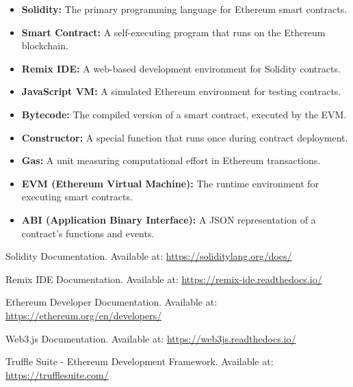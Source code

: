\documentclass[11pt]{article}
\begin{document}
\begin{itemize}
    \item \textbf{Solidity:} The primary programming language for Ethereum smart contracts.
    \item \textbf{Smart Contract:} A self-executing program that runs on the Ethereum blockchain.
    \item \textbf{Remix IDE:} A web-based development environment for Solidity contracts.
    \item \textbf{JavaScript VM:} A simulated Ethereum environment for testing contracts.
    \item \textbf{Bytecode:} The compiled version of a smart contract, executed by the EVM.
    \item \textbf{Constructor:} A special function that runs once during contract deployment.
    \item \textbf{Gas:} A unit measuring computational effort in Ethereum transactions.
    \item \textbf{EVM (Ethereum Virtual Machine):} The runtime environment for executing smart contracts.
    \item \textbf{ABI (Application Binary Interface):} A JSON representation of a contract’s functions and events.
\end{itemize}

\clearpage

\begin{thebibliography}{9}
     Solidity Documentation. Available at: \url{https://soliditylang.org/docs/}
    
     Remix IDE Documentation. Available at: \url{https://remix-ide.readthedocs.io/}
    
     Ethereum Developer Documentation. Available at: \url{https://ethereum.org/en/developers/}
    
     Web3.js Documentation. Available at: \url{https://web3js.readthedocs.io/}
    
     Truffle Suite - Ethereum Development Framework. Available at: \url{https://trufflesuite.com/}
\end{thebibliography}
\end{document}
